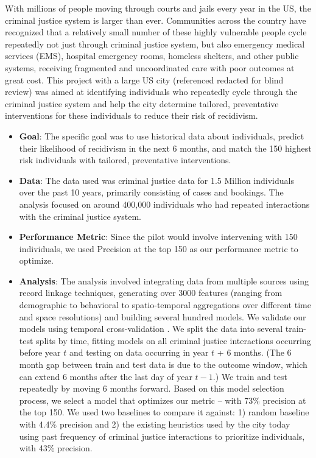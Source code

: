 With millions of people moving through courts and jails every year in the US, the criminal justice system is larger than ever. Communities across the country have recognized that a relatively small number of these highly vulnerable people cycle repeatedly not just through criminal justice system, but also emergency medical services (EMS), hospital emergency rooms, homeless shelters, and other public systems, receiving fragmented and uncoordinated care with poor outcomes at great cost. This project with a large US city (referenced redacted for blind review) was aimed at identifying individuals who repeatedly cycle through the criminal justice system and help the city determine tailored, preventative interventions for these individuals to reduce their risk of recidivism.

\begin{itemize}
\item \textbf{Goal}: The specific goal was to use historical data about individuals, predict their likelihood of recidivism in the next 6 months, and match the 150 highest risk individuals with tailored, preventative interventions.
\item \textbf{Data}: The data used was criminal justice data for 1.5 Million individuals over the past 10 years, primarily consisting of cases and bookings. The analysis focused on around 400,000 individuals who had repeated interactions with the criminal justice system.
\item \textbf{Performance Metric}: Since the pilot would involve intervening with 150 individuals, we used Precision at the top 150 as our performance metric to optimize.
\item \textbf{Analysis}: The analysis involved integrating data from multiple sources using record linkage techniques, generating over 3000 features (ranging from demographic to behavioral to spatio-temporal aggregations over different time and space resolutions) and building several hundred models. We  validate our  models  using  temporal cross-validation \cite{hyndman_forecasting:_2014}. We split the data into several train-test splits by time, fitting models on all criminal justice interactions occurring before year $t$ and testing on data occurring in year $t$ + 6 months. (The 6 month gap between train and test data is due to the outcome window, which can extend 6 months after the last day of year $t-1$.) We train and test repeatedly by moving 6 months forward.
Based on this model selection process, we select a model that optimizes our metric -- with 73\% precision at the top 150. We used two baselines to compare it against: 1) random baseline with 4.4\% precision and 2) the existing heuristics used by the city today using past frequency of criminal justice interactions to prioritize individuals, with 43\% precision.
\end{itemize}

